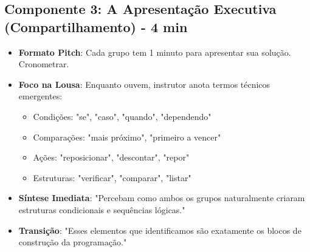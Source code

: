 \documentclass{lesson_plan}
\begin{document}
\subsection{Componente 3: A Apresentação Executiva (Compartilhamento) - 4 min}
\begin{itemize}
    \item \textbf{Formato Pitch}: Cada grupo tem 1 minuto para apresentar sua solução. Cronometrar.
    \item \textbf{Foco na Lousa}: Enquanto ouvem, instrutor anota termos técnicos emergentes:
    \begin{itemize}
        \item Condições: "se", "caso", "quando", "dependendo"
        \item Comparações: "mais próximo", "primeiro a vencer"
        \item Ações: "reposicionar", "descontar", "repor"
        \item Estruturas: "verificar", "comparar", "listar"
    \end{itemize}
    \item \textbf{Síntese Imediata}: "Percebam como ambos os grupos naturalmente criaram estruturas condicionais e sequências lógicas."
    \item \textbf{Transição}: "Esses elementos que identificamos são exatamente os blocos de construção da programação."
\end{itemize}
\end{document}
